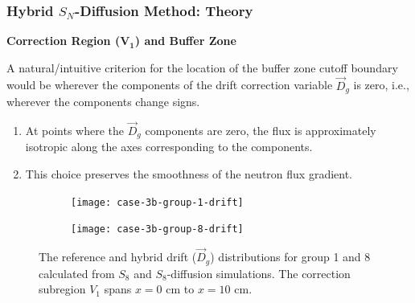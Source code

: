 \begin{frame}
  \frametitle{Hybrid $S_N$-Diffusion Method: Theory}
  \textbf{Correction Region ($\bm{V_1}$) and Buffer Zone}
  \vspace{.2cm}

  A natural/intuitive criterion for the location of the buffer zone cutoff boundary
  would be wherever the components of the drift correction variable $\vec{D}_g$ is zero, i.e.,
  wherever the components change signs.
  \begin{enumerate}
    \item At points where the $\vec{D}_g$ components are zero, the flux is approximately isotropic
      along the axes corresponding to the components.
    \item This choice preserves the smoothness of the neutron flux gradient.
  \end{enumerate}
  \begin{figure}[htb!]
      \centering
      \begin{subfigure}[t]{.49\textwidth}
          \centering
          \texttt{[image: case-3b-group-1-drift]}
      \end{subfigure}
      \hfill
      \begin{subfigure}[t]{.49\textwidth}
          \centering
          \texttt{[image: case-3b-group-8-drift]}
      \end{subfigure}
      \caption{The reference and hybrid drift ($\vec{D}_g$) distributions for group 1 and 8 calculated
        from $S_8$ and $S_8$-diffusion simulations. The correction subregion $V_1$ spans $x=0$ cm to
        $x=10$ cm.}
      \label{fig:3b-drift-1}
  \end{figure}
\end{frame}

